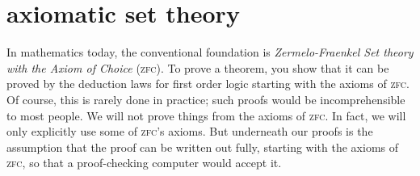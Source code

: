 \documentclass{scrbook}
\begin{document}
\section[Axiomatic set theory]{axiomatic set theory}
\newcommand{\zfc}{\textsc{zfc}\xspace}
In mathematics today, the conventional foundation is \emph{Zermelo-Fraenkel Set theory with the Axiom of Choice} (\zfc). To prove a theorem, you show that it can be proved by the deduction laws for first order logic starting with the axioms of \zfc. Of course, this is rarely done in practice; such proofs would be incomprehensible to most people. We will not prove things from the axioms of \zfc. In fact, we will only explicitly use some of \zfc's axioms. But underneath our proofs is the assumption that the proof can be written out fully, starting with the axioms of \zfc, so that a proof-checking computer would accept it. 
\end{document}
